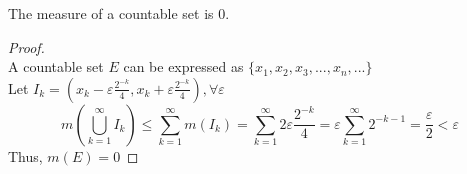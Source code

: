 \documentclass{article}
\begin{document}
	The measure of a countable set is 0. 
	\begin{proof}
		~\\
		A countable set $E$ can be expressed as $\{x_{1},x_{2},x_{3},...,x_{n},...\}$\\
		Let $I_{k}=(x_{k}-\varepsilon\frac{2^{-k}}{4},x_{k}+\varepsilon\frac{2^{-k}}{4}),\forall\varepsilon$\\
		\[m(\bigcup_{k=1}^{\infty}I_{k})\leq\sum_{k=1}^{\infty}m(I_{k})=\sum_{k=1}^{\infty}2\varepsilon\frac{2^{-k}}{4}=\varepsilon\sum_{k=1}^{\infty}2^{-k-1}=\frac{\varepsilon}{2}<\varepsilon\]
		Thus, $m(E)=0$
	\end{proof}
\end{document}
